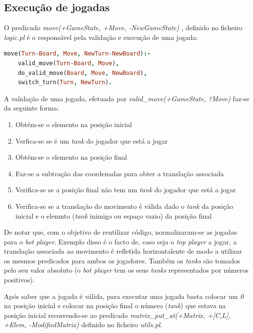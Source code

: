\documentclass[a4paper,11pt,portuguese]{article}
\begin{document}
    \subsection{Execução de jogadas}

    O predicado \textit{move(+GameState, +Move, -NewGameState)} , definido no ficheiro
    \textit{logic.pl} é o responsável pela validação e execução de uma jogada:

\begin{lstlisting}[language=prolog]
% move(+GameState, +Move, -NewGameState)
move(Turn-Board, Move, NewTurn-NewBoard):-
    valid_move(Turn-Board, Move),
    do_valid_move(Board, Move, NewBoard),
    switch_turn(Turn, NewTurn).
\end{lstlisting}

    \noindent A validação de uma jogada, efetuada por
    \textit{valid\_move(+GameState, ?Move) } faz-se da seguinte forma:

    \begin{enumerate}[topsep=4pt,itemsep=2pt]
        \item Obtém-se o elemento na posição inicial
        \item Verfica-se se é um \textit{tank} do jogador que está a jogar
        \item Obtém-se o elemento na posição final
        \item Faz-se a subtração das coordenadas para obter a translação associada
        \item Verifica-se se a posição final não tem um \textit{tank} do jogador que
        está a jogar
        \item Verifica-se se a translação do movimento é válida dado o \textit{tank}
        da posição inicial e o elemnto (\textit{tank} inimigo ou espaço vazio) da posição final
    \end{enumerate}

    \noindent De notar que, com o objetivo de reutilizar código, normalizaram-se as jogadas
    para o \textit{bot player}. Exemplo disso é o facto de, caso seja o \textit{top player}
    a jogar, a translação associada ao movimento é refletida horizontalente de modo a utilizar
    os mesmos predicados para ambos os jogadores. Também os \textit{tanks} são tomados pelo seu
    valor absoluto (o \textit{bot player} tem os seus \textit{tanks} representados por números
    positivos).

    Após saber que a jogada é válida, para executar uma jogada basta colocar um \textit{0}
    na posição inicial e colocar na posição final o número (\textit{tank}) que estava na
    posição inicial recorrendo-se ao predicado
    \textit{matrix\_put\_at(+Matrix, +[C,L], +Elem, -ModifiedMatrix) } definido no ficheiro
    \textit{utils.pl}.
\end{document}
